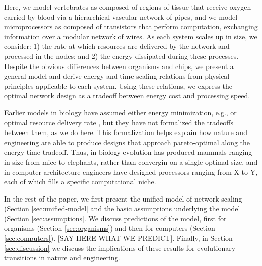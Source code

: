\documentclass[12pt]{article}
\begin{document}
Here, we model vertebrates as composed of regions of tissue that 
receive oxygen carried by blood via a hierarchical vascular network of pipes, and we 
model microprocessors as composed of transistors that perform 
computation, exchanging information over a modular network of wires.  
As each system scales up in size, we consider: 1) the rate at which 
resources are delivered by the network and processed in the nodes; 
and 2) the energy dissipated during these processes. Despite the 
obvious differences between organisms and chips, we present a general
model and derive 
energy and time scaling relations from physical principles applicable 
to each system. Using these relations, we express the optimal network 
design as a tradeoff between energy cost and processing speed. 


Earlier models in biology have assumed either energy minimization, e.g., \cite{west97} or optimal resource
delivery rate \cite{banavar10}, but they have not formalized the
tradeoffs between them, as we do here.  This formalization helps
explain how  nature and engineering are able to produce designs that
approach pareto-optimal along the 
energy-time tradeoff.
Thus, in
biology evolution has produced mammals ranging in size from mice to
elephants, rather than convergin on a single optimal size, and in computer architecture engineers have designed
processors ranging from X to Y, each of which fills a specific
computational niche.

In the rest of the paper, we first present the unified model of network
scaling (Section \ref{sec:unified-model} and the basic assumptions underlying
the model (Section \ref{sec:assumptions}.  We discuss
predictions of the model, first for 
organisms (Section \ref{sec:organisms}) and then for computers (Section
\ref{sec:computers}). [SAY HERE WHAT WE PREDICT].  Finally, in Section
  \ref{sec:discussion}  we discuss
  the implications of these results for evolutionary transitions in
  nature and engineering.
\end{document}
